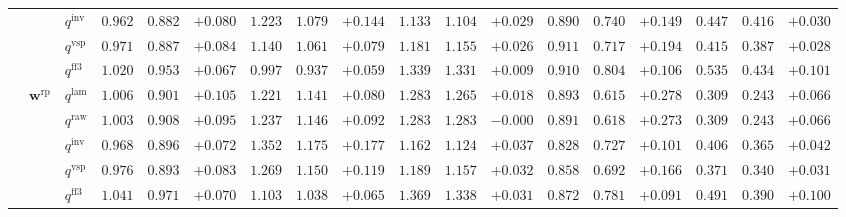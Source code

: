 \documentclass{article}
\begin{document}
\begin{table}[!htbp]
{\begin{tabular}{lll ccc ccc ccc ccc ccc}
 &  & $q^{\mathrm{inv}}$ & $0.962$ & $0.882$ & \cellcolor{posgreen!50}$+0.080$ & $1.223$ & $1.079$ & \cellcolor{posgreen!50}$+0.144$ & $1.133$ & $1.104$ & \cellcolor{posgreen!50}$+0.029$ & $0.890$ & $0.740$ & \cellcolor{posgreen!50}$+0.149$ & $0.447$ & $0.416$ & \cellcolor{posgreen!50}$+0.030$ \\
 &  & $q^{\mathrm{vsp}}$ & $0.971$ & $0.887$ & \cellcolor{posgreen!50}$+0.084$ & $1.140$ & $1.061$ & \cellcolor{posgreen!50}$+0.079$ & $1.181$ & $1.155$ & \cellcolor{posgreen!50}$+0.026$ & $0.911$ & $0.717$ & \cellcolor{posgreen!50}$+0.194$ & $0.415$ & $0.387$ & \cellcolor{posgreen!50}$+0.028$ \\
 &  & $q^{\mathrm{ff3}}$ & $1.020$ & $0.953$ & \cellcolor{posgreen!50}$+0.067$ & $0.997$ & $0.937$ & \cellcolor{posgreen!50}$+0.059$ & $1.339$ & $1.331$ & \cellcolor{posgreen!50}$+0.009$ & $0.910$ & $0.804$ & \cellcolor{posgreen!50}$+0.106$ & $0.535$ & $0.434$ & \cellcolor{posgreen!50}$+0.101$ \\
\cmidrule(lr){2-18}
 & $\mathbf{w}^{\mathrm{rp}}$ & $q^{\mathrm{lam}}$ & $1.006$ & $0.901$ & \cellcolor{posgreen!50}$+0.105$ & $1.221$ & $1.141$ & \cellcolor{posgreen!50}$+0.080$ & $1.283$ & $1.265$ & \cellcolor{posgreen!50}$+0.018$ & $0.893$ & $0.615$ & \cellcolor{posgreen!50}$+0.278$ & $0.309$ & $0.243$ & \cellcolor{posgreen!50}$+0.066$ \\
 &  & $q^{\mathrm{raw}}$ & $1.003$ & $0.908$ & \cellcolor{posgreen!50}$+0.095$ & $1.237$ & $1.146$ & \cellcolor{posgreen!50}$+0.092$ & $1.283$ & $1.283$ & $-0.000$ & $0.891$ & $0.618$ & \cellcolor{posgreen!50}$+0.273$ & $0.309$ & $0.243$ & \cellcolor{posgreen!50}$+0.066$ \\
 &  & $q^{\mathrm{inv}}$ & $0.968$ & $0.896$ & \cellcolor{posgreen!50}$+0.072$ & $1.352$ & $1.175$ & \cellcolor{posgreen!50}$+0.177$ & $1.162$ & $1.124$ & \cellcolor{posgreen!50}$+0.037$ & $0.828$ & $0.727$ & \cellcolor{posgreen!50}$+0.101$ & $0.406$ & $0.365$ & \cellcolor{posgreen!50}$+0.042$ \\
 &  & $q^{\mathrm{vsp}}$ & $0.976$ & $0.893$ & \cellcolor{posgreen!50}$+0.083$ & $1.269$ & $1.150$ & \cellcolor{posgreen!50}$+0.119$ & $1.189$ & $1.157$ & \cellcolor{posgreen!50}$+0.032$ & $0.858$ & $0.692$ & \cellcolor{posgreen!50}$+0.166$ & $0.371$ & $0.340$ & \cellcolor{posgreen!50}$+0.031$ \\
 &  & $q^{\mathrm{ff3}}$ & $1.041$ & $0.971$ & \cellcolor{posgreen!50}$+0.070$ & $1.103$ & $1.038$ & \cellcolor{posgreen!50}$+0.065$ & $1.369$ & $1.338$ & \cellcolor{posgreen!50}$+0.031$ & $0.872$ & $0.781$ & \cellcolor{posgreen!50}$+0.091$ & $0.491$ & $0.390$ & \cellcolor{posgreen!50}$+0.100$ \\
\bottomrule
\end{tabular}}
\end{table}
\end{document}
